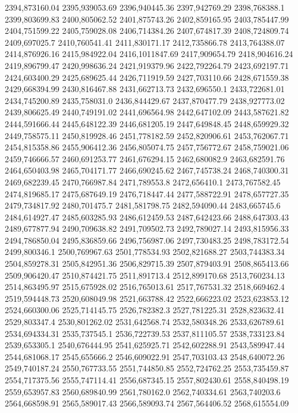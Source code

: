 2394,873160.04
2395,939053.69
2396,940445.36
2397,942769.29
2398,768388.1
2399,803699.83
2400,805062.52
2401,875743.26
2402,859165.95
2403,785447.99
2404,751599.22
2405,759028.08
2406,714384.26
2407,674817.39
2408,724809.74
2409,697025.7
2410,760541.41
2411,830171.17
2412,735866.78
2413,764388.07
2414,876926.16
2415,984922.04
2416,1011847.69
2417,909654.79
2418,904616.24
2419,896799.47
2420,998636.24
2421,919379.96
2422,792264.79
2423,692197.71
2424,603400.29
2425,689625.44
2426,711919.59
2427,703110.66
2428,671559.38
2429,668394.99
2430,816467.88
2431,662713.73
2432,696550.1
2433,722681.01
2434,745200.89
2435,758031.0
2436,844429.67
2437,870477.79
2438,927773.02
2439,806625.49
2440,749191.02
2441,696564.98
2442,647102.09
2443,587621.82
2444,591666.44
2445,648122.39
2446,681205.19
2447,649848.45
2448,659929.32
2449,758575.11
2450,819928.46
2451,778182.59
2452,820906.61
2453,762067.71
2454,815358.86
2455,906412.36
2456,805074.75
2457,756772.67
2458,759021.06
2459,746666.57
2460,691253.77
2461,676294.15
2462,680082.9
2463,682591.76
2464,650403.98
2465,704171.77
2466,690245.62
2467,745738.24
2468,740300.31
2469,682239.45
2470,766987.84
2471,789553.8
2472,656410.1
2473,767582.45
2474,819685.17
2475,687649.19
2476,718447.44
2477,588722.91
2478,657727.35
2479,734817.92
2480,701475.7
2481,581798.75
2482,594090.44
2483,665745.6
2484,614927.47
2485,603285.93
2486,612459.53
2487,642423.66
2488,647303.43
2489,677877.94
2490,709638.82
2491,709502.73
2492,789027.14
2493,815956.33
2494,786850.04
2495,836859.66
2496,756987.06
2497,730483.25
2498,783172.54
2499,800346.1
2500,769967.63
2501,778534.93
2502,821688.27
2503,744383.34
2504,859278.31
2505,842951.36
2506,829715.39
2507,879403.91
2508,865413.66
2509,906420.47
2510,874421.75
2511,891713.4
2512,899170.68
2513,760234.13
2514,863495.97
2515,675928.02
2516,765013.61
2517,767531.32
2518,669462.4
2519,594448.73
2520,608049.98
2521,663788.42
2522,666223.02
2523,623853.12
2524,660300.06
2525,714145.75
2526,782382.3
2527,781225.31
2528,823632.41
2529,803347.4
2530,801262.02
2531,642568.74
2532,580348.26
2533,626789.61
2534,694334.31
2535,737545.1
2536,722739.53
2537,811105.57
2538,733123.84
2539,653305.1
2540,676444.95
2541,625925.71
2542,602288.91
2543,589947.44
2544,681068.17
2545,655666.2
2546,609022.91
2547,703103.43
2548,640072.26
2549,740187.24
2550,767733.55
2551,744850.85
2552,724762.25
2553,735459.87
2554,717375.56
2555,747114.41
2556,687345.15
2557,802430.61
2558,840498.19
2559,653957.83
2560,689840.99
2561,780162.0
2562,740334.61
2563,740203.6
2564,668598.91
2565,589017.43
2566,589093.74
2567,564406.52
2568,615554.09
